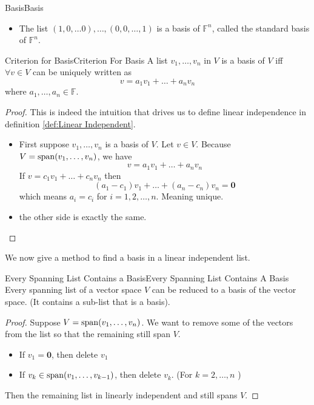 \documentclass[../main.tex]{subfiles}
\begin{document}
\begin{example}{Basis}{Basis}
\begin{itemize}
\item The list $(1,0, \ldots 0), \ldots ,(0,0, \ldots ,1)$ is a basis of $\mathbb{F}^{n}$, called the standard basis of $\mathbb{F}^{n}$.
\end{itemize}
\end{example}

\begin{theorem}{Criterion for Basis}{Criterion For Basis}
A list $v_1, \ldots ,v_n$ in $V$ is a basis of $V$ iff $\forall v \in V$ can be uniquely written as 
\begin{equation}
v = a_1v_1+\ldots +a_nv_n
\end{equation}
where $a_1, \ldots ,a_n \in \mathbb{F}$.
\end{theorem}
\begin{proof}
	This is indeed the intuition that drives us to define linear independence in definition \ref{def:Linear Independent}. 

	\begin{itemize}
	\item First suppose $v_1, \ldots ,v_n$ is a basis of $V$. Let $v \in V$. Because $V=\operatorname{span}(v_1, \ldots ,v_n)$, we have
		\begin{equation*}
		v=a_1v_1+\ldots +a_nv_n
		\end{equation*}
		If $v=c_1v_1+\ldots +c_nv_n$ 
		then
		\begin{equation*}
			(a_1-c_1)v_1+\ldots +(a_n-c_n)v_n=\boldsymbol{0}
		\end{equation*}
		which means $a_i=c_i$ for $i=1,2, \ldots ,n$. Meaning unique.
	\item the other side is exactly the same.
	\end{itemize}
\end{proof}

We now give a method to find a basis in a linear independent list.
\begin{theorem}{Every Spanning List Contains a Basis}{Every Spanning List Contains A Basis}
Every spanning list of a vector space $V$ can be reduced to a basis of the vector space. (It contains a sub-list that is a basis).
\end{theorem}
\begin{proof}
Suppose $V=\operatorname{span}(v_1, \ldots ,v_n)$. We want to remove some of the vectors from the list so that the remaining still span $V$.
\begin{itemize}
	\item If $v_1=\boldsymbol{0}$, then delete $v_1$
	\item If $v_k \in \operatorname{span}(v_1, \ldots ,v_{k-1})$, then delete $v_k$. (For  $k=2, \ldots ,n$ )
\end{itemize}
Then the remaining list in linearly independent and still spans $V$.
\end{proof}
\end{document}
